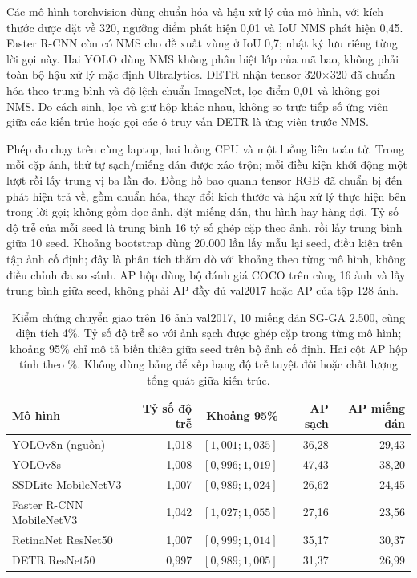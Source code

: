 \documentclass[a4paper,fleqn]{cas-dc}
\begin{document}
Các mô hình torchvision dùng chuẩn hóa và hậu xử lý của mô hình, với kích thước được đặt về 320, ngưỡng điểm phát hiện 0,01 và IoU NMS phát hiện 0,45. Faster R-CNN còn có NMS cho đề xuất vùng ở IoU 0,7; nhật ký lưu riêng từng lời gọi này. Hai YOLO dùng NMS không phân biệt lớp của mã bao, không phải toàn bộ hậu xử lý mặc định Ultralytics. DETR nhận tensor 320×320 đã chuẩn hóa theo trung bình và độ lệch chuẩn ImageNet, lọc điểm 0,01 và không gọi NMS. Do cách sinh, lọc và giữ hộp khác nhau, không so trực tiếp số ứng viên giữa các kiến trúc hoặc gọi các ô truy vấn DETR là ứng viên trước NMS.

Phép đo chạy trên cùng laptop, hai luồng CPU và một luồng liên toán tử. Trong mỗi cặp ảnh, thứ tự sạch/miếng dán được xáo trộn; mỗi điều kiện khởi động một lượt rồi lấy trung vị ba lần đo. Đồng hồ bao quanh tensor RGB đã chuẩn bị đến phát hiện trả về, gồm chuẩn hóa, thay đổi kích thước và hậu xử lý thực hiện bên trong lời gọi; không gồm đọc ảnh, đặt miếng dán, thu hình hay hàng đợi. Tỷ số độ trễ của mỗi seed là trung bình 16 tỷ số ghép cặp theo ảnh, rồi lấy trung bình giữa 10 seed. Khoảng bootstrap dùng 20.000 lần lấy mẫu lại seed, điều kiện trên tập ảnh cố định; đây là phân tích thăm dò với khoảng theo từng mô hình, không điều chỉnh đa so sánh. AP hộp dùng bộ đánh giá COCO trên cùng 16 ảnh và lấy trung bình giữa seed, không phải AP đầy đủ val2017 hoặc AP của tập 128 ảnh.

\begin{table}[t]
\centering
\small
\caption{Kiểm chứng chuyển giao trên 16 ảnh val2017, 10 miếng dán SG-GA 2.500, cùng diện tích 4\%. Tỷ số độ trễ so với ảnh sạch được ghép cặp trong từng mô hình; khoảng 95\% chỉ mô tả biến thiên giữa seed trên bộ ảnh cố định. Hai cột AP hộp tính theo \%. Không dùng bảng để xếp hạng độ trễ tuyệt đối hoặc chất lượng tổng quát giữa kiến trúc.}
\begin{tabularx}{\textwidth}{Xrrrr}
\toprule
Mô hình & Tỷ số độ trễ & Khoảng 95\% & AP sạch & AP miếng dán \\
\midrule
YOLOv8n (nguồn) & 1,018 & $[1{,}001;1{,}035]$ & 36,28 & 29,43 \\
YOLOv8s & 1,008 & $[0{,}996;1{,}019]$ & 47,43 & 38,20 \\
SSDLite MobileNetV3 & 1,007 & $[0{,}989;1{,}024]$ & 26,62 & 24,45 \\
Faster R-CNN MobileNetV3 & 1,042 & $[1{,}027;1{,}055]$ & 27,16 & 23,56 \\
RetinaNet ResNet50 & 1,007 & $[0{,}999;1{,}014]$ & 35,17 & 30,37 \\
DETR ResNet50 & 0,997 & $[0{,}989;1{,}005]$ & 31,37 & 26,99 \\
\bottomrule
\end{tabularx}
\label{tab:extended_transfer}
\end{table}
\end{document}
